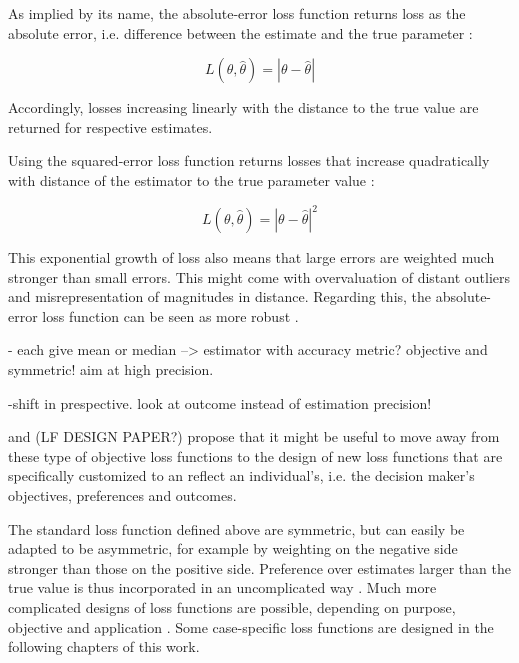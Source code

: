         As implied by its name, the absolute-error loss function returns loss as the absolute error, i.e. difference between the estimate and the true parameter \cite{davidson2015}:
        
        \begin{equation}\label{eq:LossFunction}
        L(\theta,\hat{\theta}) = |\theta - \hat{\theta}|
        \end{equation}        
        
        Accordingly, losses increasing linearly with the distance to the true value are returned for respective estimates.
        
        Using the squared-error loss function returns losses that increase quadratically with distance of the estimator to the true parameter value \cite{davidson2015}:
        
        \begin{equation}\label{eq:LossFunction}
        L(\theta,\hat{\theta}) = |\theta - \hat{\theta}|^2
        \end{equation}        
        
        This exponential growth of loss also means that large errors are weighted much stronger than small errors. This might come with overvaluation of distant outliers and misrepresentation of magnitudes in distance. Regarding this, the absolute-error loss function can be seen as more robust \cite{davidson2015}.
        
        - each give mean or median --> estimator with accuracy metric? objective and symmetric! aim at high precision. 
        
        -shift in prespective. look at outcome instead of estimation precision!     
           
        \cite{davidson2015} and (LF DESIGN PAPER?) propose that it might be useful to move away from these type of objective loss functions to the design of new loss functions that are specifically customized to an reflect an individual's, i.e. the decision maker's objectives, preferences and outcomes. 
        
        The standard loss function defined above are symmetric, but can easily be adapted to be asymmetric, for example by weighting on the negative side stronger than those on the positive side. Preference over estimates larger than the true value is thus incorporated in an uncomplicated way \cite{davidson2015}. Much more complicated designs of loss functions are possible, depending on purpose, objective and application \cite{davidson2015}. Some case-specific loss functions are designed in the following chapters of this work.
        
